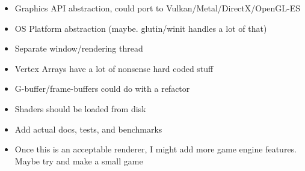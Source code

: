 \begin{multicols}{2}
  \begin{itemize}
    \item Graphics API abstraction, could port to Vulkan/Metal/DirectX/OpenGL-ES
    \item OS Platform abstraction (maybe. glutin/winit handles a lot of that)
    \item Separate window/rendering thread
    \item Vertex Arrays have a lot of nonsense hard coded stuff
    \item G-buffer/frame-buffers could do with a refactor
    \item Shaders should be loaded from disk
    \item Add actual docs, tests, and benchmarks
    \item Once this is an acceptable renderer, I might add more game engine features. Maybe try and make a small game
  \end{itemize}

\end{multicols}






